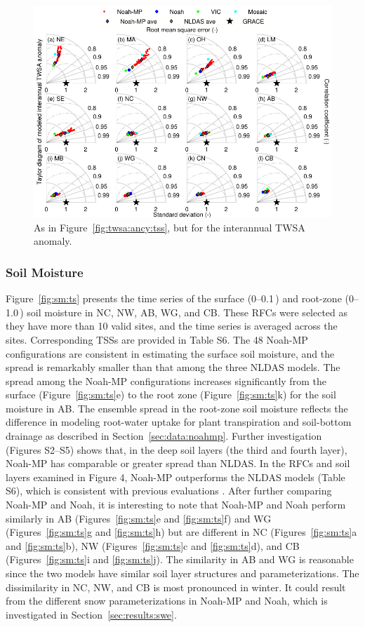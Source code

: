 \documentclass[essd, manuscript]{copernicus}
\let\unit\undefined
\begin{document}
\begin{figure}[t]
  \includegraphics[width=12cm]{fig/fig03.pdf}
  \caption{As in Figure~\ref{fig:twsa:ancy:tss}, but for the interannual TWSA anomaly.}
  \label{fig:twsa:anom:tss}
\end{figure}

\subsubsection{Soil Moisture}

Figure~\ref{fig:sm:ts} presents the time series of the surface (0--0.1\,\unit{m}) and root-zone (0--1.0\,\unit{m}) soil moisture in NC, NW, AB, WG, and CB. These RFCs were selected as they have more than 10 valid sites, and the time series is averaged across the sites. Corresponding TSSs are provided in Table S6. The 48 Noah-MP configurations are consistent in estimating the surface soil moisture, and the spread is remarkably smaller than that among the three NLDAS models. The spread among the Noah-MP configurations increases significantly from the surface (Figure~\ref{fig:sm:ts}e) to the root zone (Figure~\ref{fig:sm:ts}k) for the soil moisture in AB. The ensemble spread in the root-zone soil moisture reflects the difference in modeling root-water uptake for plant transpiration and soil-bottom drainage as described in Section~\ref{sec:data:noahmp}. Further investigation (Figures S2--S5) shows that, in the deep soil layers (the third and fourth layer), Noah-MP has comparable or greater spread than NLDAS. In the RFCs and soil layers examined in Figure 4, Noah-MP outperforms the NLDAS models (Table S6), which is consistent with previous evaluations \citep{cai2014JGRAa}. After further comparing Noah-MP and Noah, it is interesting to note that Noah-MP and Noah perform similarly in AB (Figures~\ref{fig:sm:ts}e and \ref{fig:sm:ts}f) and WG (Figures~\ref{fig:sm:ts}g and \ref{fig:sm:ts}h) but are different in NC (Figures~\ref{fig:sm:ts}a and \ref{fig:sm:ts}b), NW (Figures~\ref{fig:sm:ts}c and \ref{fig:sm:ts}d), and CB (Figures~\ref{fig:sm:ts}i and \ref{fig:sm:ts}j). The similarity in AB and WG is reasonable since the two models have similar soil layer structures and parameterizations. The dissimilarity in NC, NW, and CB is most pronounced in winter. It could result from the different snow parameterizations in Noah-MP and Noah, which is investigated in Section~\ref{sec:results:swe}.
\end{document}
